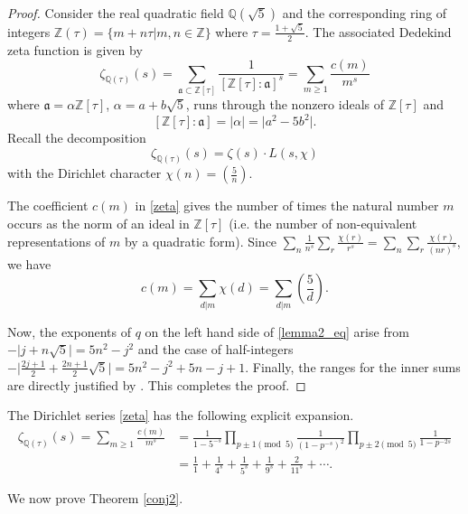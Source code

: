 \documentclass[a4paper,reqno,12pt]{amsart}
\begin{document}
\begin{proof} Consider the real quadratic field $\mathbb{Q}(\sqrt5)$ and the corresponding ring of integers $\mathbb{Z}(\tau)=\{m+n\tau\vert m,n\in\mathbb{Z}\}$ where $\tau=\frac{1+\sqrt{5}}2$. The associated Dedekind zeta function is given by
\begin{equation}\label{zeta} \zeta_{\mathbb{Q}(\tau)}(s)=\sum_{\mathfrak{a}\subset\mathbb{Z}[\tau]}\frac1{[\mathbb{Z}[\tau]:\mathfrak{a}]^s}=\sum_{m\geq1} \frac{c(m)}{m^s}\end{equation}
where $\mathfrak{a}=\alpha\mathbb{Z}[\tau]$, $\alpha=a+b\sqrt 5$,  runs through the nonzero ideals of $\mathbb{Z}[\tau]$ and $$[\mathbb{Z}[\tau]:\mathfrak{a}]=\vert\alpha\vert=\vert a^2-5b^2\vert.$$
Recall the decomposition 
\cite[Part II, Section 11]{Zagier}
$$\zeta_{\mathbb{Q}(\tau)}(s)=\zeta(s)\cdot L(s,\chi)$$ with the Dirichlet character $\chi(n)=\left(\frac5n\right)$. 
\smallskip



The coefficient $c(m)$ in  \eqref{zeta}   gives the number of times the  natural number $m$ occurs as the norm of an ideal in $\mathbb{Z}[\tau]$ (i.e. the number of non-equivalent representations of $m$ by a quadratic form). Since
$\sum_n \frac1{n^s}\sum_r \frac{\chi(r)}{r^s}=\sum_n \sum_r\frac{\chi(r)}{(nr)^s}$,  we have  $$c(m)=\sum_{d\vert m} \chi(d)=\sum_{d\vert m} \left(\frac5d\right).$$


\smallskip
\noindent
Now, the exponents of $q$ on the left hand side of \eqref{lemma2_eq}  arise from   $-\vert j+n\sqrt5\vert=5n^2-j^2$ and the case of half-integers $-\vert \frac{2j+1}2+\frac{2n+1}2\sqrt5\vert=5n^2-j^2+5n-j+1$.  
 Finally, the ranges for the inner sums are directly justified by \cite[Lemma 3]{Andrews3}. This completes the proof. 
\end{proof}

\begin{remark}
  The Dirichlet series \eqref{zeta} has the following explicit expansion.
\begin{align*}
\zeta_{\mathbb{Q}(\tau)}(s)=\sum_{m\geq1} \frac{c(m)}{m^s}
&=\frac1{1-5^{-s}}\prod_{p\pm1\pmod 5}\frac1{(1-p^{-s})^2}\prod_{p\pm2\pmod 5}\frac1{1-p^{-2s}}  \\
&=\frac11+\frac1{4^s}+\frac1{5^s}+\frac1{9^s}+\frac2{11^s}+\cdots . 
\end{align*}
\end{remark}

\smallskip
\noindent
We now prove Theorem \ref{conj2}.
\end{document}
